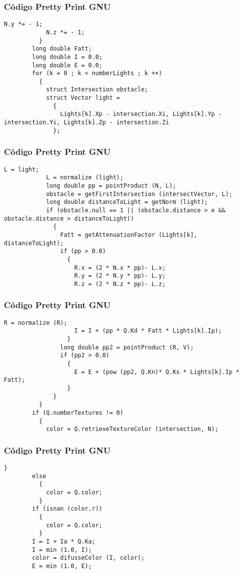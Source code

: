 \documentclass{beamer}
\begin{document}
\begin{frame}[fragile]
\frametitle{C\'odigo Pretty Print GNU}
\begin{lstlisting}[style=CStyle]
            N.y *= - 1;
            N.z *= - 1;
          }
        long double Fatt;
        long double I = 0.0;
        long double E = 0.0;
        for (k = 0 ; k < numberLights ; k ++)
          {
            struct Intersection obstacle;
            struct Vector light =
              {
                Lights[k].Xp - intersection.Xi, Lights[k].Yp - intersection.Yi, Lights[k].Zp - intersection.Zi
              };
\end{lstlisting}
\end{frame}
\begin{frame}[fragile]
\frametitle{C\'odigo Pretty Print GNU}
\begin{lstlisting}[style=CStyle]
            L = light;
            L = normalize (light);
            long double pp = pointProduct (N, L);
            obstacle = getFirstIntersection (intersectVector, L);
            long double distanceToLight = getNorm (light);
            if (obstacle.null == 1 || (obstacle.distance > e && obstacle.distance > distanceToLight))
              {
                Fatt = getAttenuationFactor (Lights[k], distanceToLight);
                if (pp > 0.0)
                  {
                    R.x = (2 * N.x * pp)- L.x;
                    R.y = (2 * N.y * pp)- L.y;
                    R.z = (2 * N.z * pp)- L.z;
\end{lstlisting}
\end{frame}
\begin{frame}[fragile]
\frametitle{C\'odigo Pretty Print GNU}
\begin{lstlisting}[style=CStyle]
                    R = normalize (R);
                    I = I + (pp * Q.Kd * Fatt * Lights[k].Ip);
                  }
                long double pp2 = pointProduct (R, V);
                if (pp2 > 0.0)
                  {
                    E = E + (pow (pp2, Q.Kn)* Q.Ks * Lights[k].Ip * Fatt);
                  }
              }
          }
        if (Q.numberTextures != 0)
          {
            color = Q.retrieveTextureColor (intersection, N);
\end{lstlisting}
\end{frame}
\begin{frame}[fragile]
\frametitle{C\'odigo Pretty Print GNU}
\begin{lstlisting}[style=CStyle]
          }
        else
          {
            color = Q.color;
          }
        if (isnan (color.r))
          {
            color = Q.color;
          }
        I = I + Ia * Q.Ka;
        I = min (1.0, I);
        color = difusseColor (I, color);
        E = min (1.0, E);
\end{lstlisting}
\end{frame}
\end{document}
